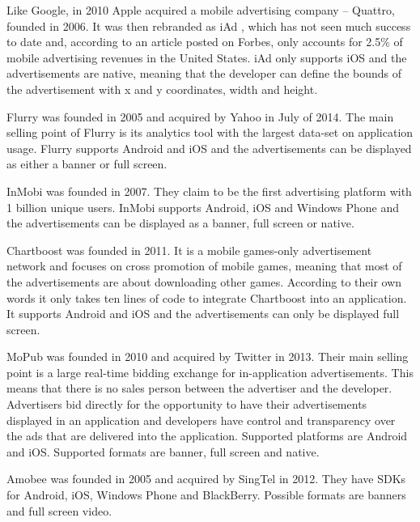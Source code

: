 Like Google, in 2010 Apple acquired a mobile advertising company -- Quattro, founded in 2006. \cite{crunchbase-quattro} It was then rebranded as iAd \cite{forbes-iad}, which has not seen much success to date and, according to an article posted on Forbes, only accounts for 2.5\% of mobile advertising revenues in the United States. \cite{forbes-iad2} iAd only supports iOS and the advertisements are native, meaning that the developer can define the bounds of the advertisement with x and y coordinates, width and height. \cite{iad-tutorial}

Flurry was founded in 2005 and acquired by Yahoo in July of 2014. \cite{crunchbase-flurry} The main selling point of Flurry is its analytics tool with the largest data-set on application usage. \cite{maps-yankeegroup} Flurry supports Android and iOS and the advertisements can be displayed as either a banner or full screen.

InMobi was founded in 2007. \cite{crunchbase-inmobi} They claim to be the first advertising platform with 1 billion unique users. \cite{inmobi} InMobi supports Android, iOS and Windows Phone \cite{inmobi-monetize} and the advertisements can be displayed as a banner, full screen or native. \cite{inmobi-sdk}

Chartboost was founded in 2011. \cite{crunchbase-chartboost} It is a mobile games-only advertisement network and focuses on cross promotion of mobile games, meaning that most of the advertisements are about downloading other games. According to their own words it only takes ten lines of code to integrate Chartboost into an application. \cite{chartboost} It supports Android and iOS and the advertisements can only be displayed full screen.\cite{hongikiat-monetize}

MoPub was founded in 2010 and acquired by Twitter in 2013. \cite{crunchbase-mopub} Their main selling point is a large real-time bidding exchange for in-application advertisements. This means that there is no sales person between the advertiser and the developer. Advertisers bid directly for the opportunity to have their advertisements displayed in an application and developers have  control and transparency over the ads that are delivered into the application. \cite{mopub-marketplace} Supported platforms are Android and iOS. \cite{mopub-resources} Supported formats are banner, full screen and native.

Amobee was founded in 2005 and acquired by SingTel in 2012. \cite{crunchbase-amobee} They have SDKs for Android, iOS, Windows Phone and BlackBerry. Possible formats are banners and full screen video.

